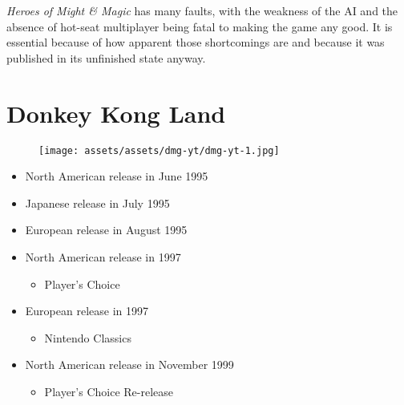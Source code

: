 \documentclass{book}
\begin{document}
\emph{Heroes of Might \& Magic} has many faults, with the weakness of the AI and the absence of hot-seat multiplayer being fatal to making the game any good. It is essential because of how apparent those shortcomings are and because it was published in its unfinished state anyway.



\begingroup \chapter*{Donkey Kong Land} \endgroup
\begin{figure}[H]
\vskip 4pt
\centering
\texttt{[image: assets/assets/dmg-yt/dmg-yt-1.jpg]}\end{figure}
\begin{itemize} [nosep]




\item North American release in June 1995







\item Japanese release in July 1995







\item European release in August 1995







\item North American release in 1997
\begin{itemize} [nosep]\item Player’s Choice\end{itemize}\noindent






\item European release in 1997
\begin{itemize} [nosep]\item Nintendo Classics\end{itemize}\noindent






\item North American release in November 1999
\begin{itemize} [nosep]\item Player’s Choice Re-release\end{itemize}\noindent







\end{itemize}
\end{document}
